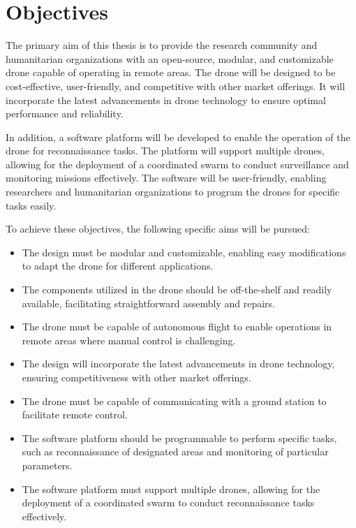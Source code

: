 \chapter{Objectives}\label{ch:objectives}

The primary aim of this thesis is to provide the research community and humanitarian organizations with an open-source, modular, and customizable drone capable of operating in remote areas. The drone will be designed to be cost-effective, user-friendly, and competitive with other market offerings. It will incorporate the latest advancements in drone technology to ensure optimal performance and reliability.

In addition, a software platform will be developed to enable the operation of the drone for reconnaissance tasks. The platform will support multiple drones, allowing for the deployment of a coordinated swarm to conduct surveillance and monitoring missions effectively. The software will be user-friendly, enabling researchers and humanitarian organizations to program the drones for specific tasks easily.

To achieve these objectives, the following specific aims will be pursued:

\begin{itemize}
  \item The design must be modular and customizable, enabling easy modifications to adapt the drone for different applications.

  \item The components utilized in the drone should be off-the-shelf and readily available, facilitating straightforward assembly and repairs.

  \item The drone must be capable of autonomous flight to enable operations in remote areas where manual control is challenging.

  \item The design will incorporate the latest advancements in drone technology, ensuring competitiveness with other market offerings.

  \item The drone must be capable of communicating with a ground station to facilitate remote control.

  \item The software platform should be programmable to perform specific tasks, such as reconnaissance of designated areas and monitoring of particular parameters.

  \item The software platform must support multiple drones, allowing for the deployment of a coordinated swarm to conduct reconnaissance tasks effectively.
\end{itemize}
